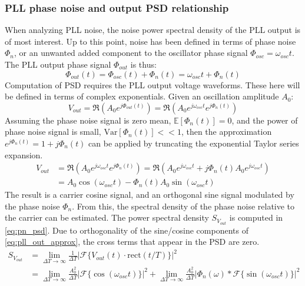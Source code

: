 	\subsubsection{PLL phase noise and output PSD relationship}\label{pn_noise_psd}
		When analyzing PLL noise, the noise power spectral density of the PLL output is of most interest. Up to this point, noise has been defined in terms of phase noise $\Phi_{n}$, or an unwanted added component to the oscillator phase signal $\Phi_{osc}=\omega_{osc}t$. The PLL output phase signal $\Phi_{out}$ is thus:
		\begin{equation}
			\Phi_{out}(t) = \Phi_{osc}(t) + \Phi_{n}(t) = \omega_{osc}t + \Phi_{n}(t) 
		\end{equation}
		Computation of PSD requires the PLL output voltage waveforms. These here will be defined in terms of complex exponentials. Given an oscillation amplitude $A_0$:
		\begin{equation}
			V_{out} = \Re\left(A_0e^{j\Phi_{out}(t)}\right) = \Re\left(A_0e^{j\omega_{osc}t}e^{j\Phi_{n}(t)}\right)
		\end{equation}
		Assuming the phase noise signal is zero mean, $\mathbb{E}[\Phi_{n}(t)]=0$, and the power of phase noise signal is small, $\mathrm{Var}[\Phi_{n}(t)] << 1$, then the approximation $e^{j\Phi_{n}(t)} = 1 + j\Phi_{n}(t)$ can be applied by truncating the exponential Taylor series expansion.
		\begin{align}
			V_{out} &= \Re\left(A_0e^{j\omega_{osc}t}e^{j\Phi_{n}(t)}\right) = \Re\left(A_0e^{j\omega_{osc}t} +j\Phi_{n}(t)A_0e^{j\omega_{osc}t}\right)\\
			&= A_0\cos(\omega_{osc}t) - \Phi_{n}(t)A_0\sin(\omega_{osc}t) \label{eq:pll_out_approx}
		\end{align}
		The result is a carrier cosine signal, and an orthogonal sine signal modulated by the phase noise $\Phi_{n}$. From this, the spectral density of the phase noise relative to the carrier can be estimated. The power spectral density $S_{V_{out}}$ is computed in \ref{eq:pn_psd}. Due to orthogonality of the sine/cosine components of \ref{eq:pll_out_approx}, the cross terms that appear in the PSD are zero. 
		\begin{align}
			S_{V_{out}} &= \lim_{\Delta T\rightarrow\infty}\frac{1}{\Delta T}|\mathcal{F}\{V_{out}(t)\cdot\mathrm{rect}(t/T)\}|^2 \\
			&=\lim_{\Delta T\rightarrow\infty}\frac{A_0^2}{\Delta T}|\mathcal{F}\{\cos(\omega_{osc}t)\}|^2 + \lim_{\Delta T\rightarrow\infty}\frac{A_0^2}{\Delta T}|\Phi_{n}(\omega)*\mathcal{F}\{\sin(\omega_{osc}t)\}|^2 \label{eq:pn_psd}
		\end{align}
